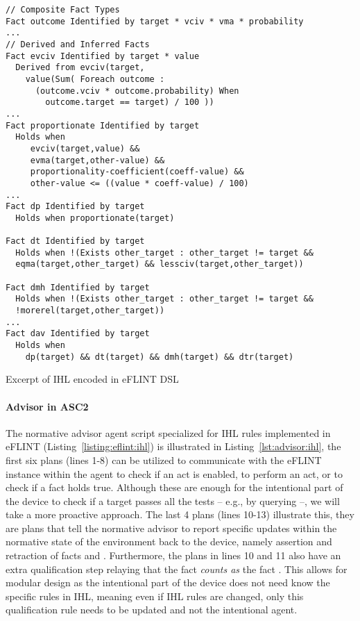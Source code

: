 \begin{listing}[t]
\centering
\begin{tcolorbox}[left=2pt,right=2pt,top=2pt,bottom=2pt]
\begin{verbatim}
// Composite Fact Types
Fact outcome Identified by target * vciv * vma * probability
...
// Derived and Inferred Facts
Fact evciv Identified by target * value
  Derived from evciv(target, 
    value(Sum( Foreach outcome : 
      (outcome.vciv * outcome.probability) When 
        outcome.target == target) / 100 ))
...
Fact proportionate Identified by target
  Holds when
     evciv(target,value) &&
     evma(target,other-value) &&
     proportionality-coefficient(coeff-value) &&
     other-value <= ((value * coeff-value) / 100)
...
Fact dp Identified by target
  Holds when proportionate(target)
  
Fact dt Identified by target
  Holds when !(Exists other_target : other_target != target &&
  eqma(target,other_target) && lessciv(target,other_target))

Fact dmh Identified by target
  Holds when !(Exists other_target : other_target != target &&
  !morerel(target,other_target))
...  
Fact dav Identified by target
  Holds when 
    dp(target) && dt(target) && dmh(target) && dtr(target)
\end{verbatim}
\end{tcolorbox}
\caption{Excerpt of IHL encoded in eFLINT DSL}
\label{listing:eflint:ihl}
\end{listing}

\paragraph{Advisor in ASC2}
The normative advisor agent script specialized for IHL rules implemented in eFLINT (Listing~\ref{listing:eflint:ihl}) is illustrated in Listing~\ref{lst:advisor:ihl}, the first six plans (lines 1-8) can be utilized to communicate with the eFLINT instance within the agent to check if an act is enabled, to perform an act, or to check if a fact holds true. Although these are enough for the intentional part of the device to check if a target passes all the tests -- e.g., by querying --, we will take a more proactive approach. The last 4 plans (lines 10-13) illustrate this, they are plans that tell the normative advisor to report specific updates within the normative state of the environment back to the device, namely assertion and retraction of facts  and . Furthermore, the plans in lines 10 and 11 also have an extra qualification step relaying that the fact  \textit{counts as} the fact . This allows for modular design as the intentional part of the device does not need know the specific rules in IHL, meaning even if IHL rules are changed, only this qualification rule needs to be updated and not the intentional agent.

